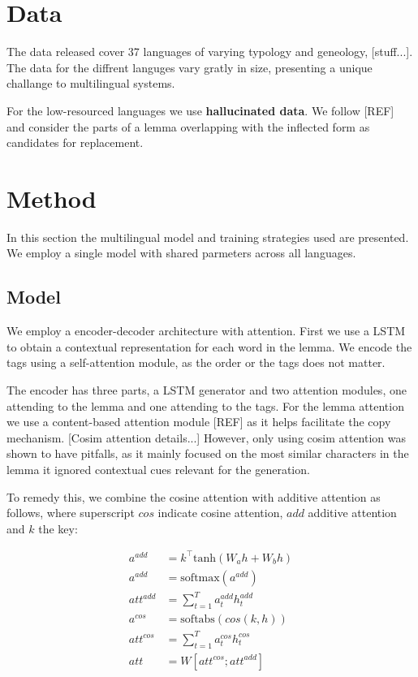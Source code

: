 \documentclass[11pt,a4paper]{article}
\begin{document}
\section{Data}

The data released cover 37 languages of varying typology and
geneology, [stuff...]. The data for the diffrent languges vary gratly
in size, presenting a unique challange to multilingual systems.

For the low-resourced languages we use \textbf{hallucinated data}. We
follow [REF] and consider the parts of a lemma overlapping with the
inflected form as candidates for replacement.


\section{Method}

In this section the multilingual model and training strategies used
are presented. We employ a single model with shared parmeters
across all languages. 

\subsection{Model}

We employ a encoder-decoder architecture with attention. First we use
a LSTM to obtain a contextual representation for each word in the
lemma. We encode the tags using a self-attention module, as the order
or the tags does not matter.

The encoder has three parts, a LSTM generator and two attention
modules, one attending to the lemma and one attending to the tags. For
the lemma attention we use a content-based attention module [REF] as
it helps facilitate the copy mechanism. [Cosim attention details...]
However, only using cosim attention was shown to have pitfalls, as it
mainly focused on the most similar characters in the lemma it ignored
contextual cues relevant for the generation.

To remedy this, we combine the cosine attention with additive
attention as follows, where superscript $cos$ indicate cosine attention,
$add$ additive attention and $k$ the key:

\begin{align*}
	a^{add} & = k^\top\text{tanh}(W_ah + W_bh)\\
    a^{add} & = \text{softmax}(a^{add})\\
	att^{add} & = \sum_{t=1}^{T}a_t^{add}h_t^{add}\\
	a^{cos} & = \text{softabs}(cos(k,h))\\
	att^{cos} & = \sum_{t=1}^{T}a_t^{cos}h_t^{cos}\\
	att & = W[att^{cos}; att^{add}]
\end{align*}
\end{document}
